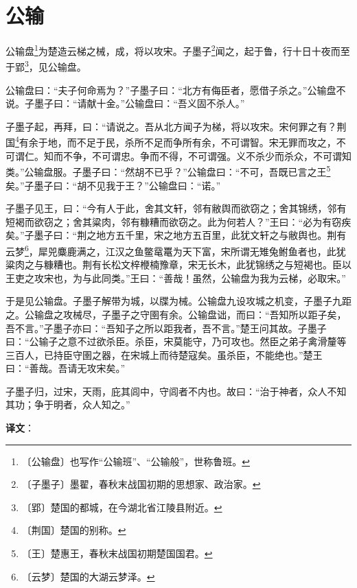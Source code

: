 \documentclass[12pt,UTF-8,openany]{ctexbook}
\begin{document}
\chapter{公输}

\begin{normalsize}
    
    公输盘\footnote{〔公输盘〕也写作“公输班”、“公输般”，世称鲁班。}为楚造云梯之械，成，将以攻宋。子墨子\footnote{〔子墨子〕墨翟，春秋末战国初期的思想家、政治家。}闻之，起于鲁，行十日十夜而至于郢\footnote{〔郢〕楚国的都城，在今湖北省江陵县附近。}，见公输盘。
    
    公输盘曰：“夫子何命焉为？”子墨子曰：“北方有侮臣者，愿借子杀之。”公输盘不说。子墨子曰：“请献十金。”公输盘曰：“吾义固不杀人。”
    
    子墨子起，再拜，曰：“请说之。吾从北方闻子为梯，将以攻宋。宋何罪之有？荆国\footnote{〔荆国〕楚国的别称。}有余于地，而不足于民，杀所不足而争所有余，不可谓智。宋无罪而攻之，不可谓仁。知而不争，不可谓忠。争而不得，不可谓强。义不杀少而杀众，不可谓知类。”公输盘服。子墨子曰：“然胡不已乎？”公输盘曰：“不可，吾既已言之王\footnote{〔王〕楚惠王，春秋末战国初期楚国国君。}矣。”子墨子曰：“胡不见我于王？”公输盘曰：“诺。”
    
    子墨子见王，曰：“今有人于此，舍其文轩，邻有敝舆而欲窃之；舍其锦绣，邻有短褐而欲窃之；舍其粱肉，邻有糠糟而欲窃之。此为何若人？”王曰：“必为有窃疾矣。”子墨子曰：“荆之地方五千里，宋之地方五百里，此犹文轩之与敝舆也。荆有云梦\footnote{〔云梦〕楚国的大湖云梦泽。}，犀兕麋鹿满之，江汉之鱼鳖鼋鼍为天下富，宋所谓无雉兔鲋鱼者也，此犹粱肉之与糠糟也。荆有长松文梓楩楠豫章，宋无长木，此犹锦绣之与短褐也。臣以王吏之攻宋也，为与此同类。”王曰：“善哉！虽然，公输盘为我为云梯，必取宋。”
    
    于是见公输盘。子墨子解带为城，以牒为械。公输盘九设攻城之机变，子墨子九距之。公输盘之攻械尽，子墨子之守圉有余。公输盘诎，而曰：“吾知所以距子矣，吾不言。”子墨子亦曰：“吾知子之所以距我者，吾不言。”楚王问其故。子墨子曰：“公输子之意不过欲杀臣。杀臣，宋莫能守，乃可攻也。然臣之弟子禽滑釐等三百人，已持臣守圉之器，在宋城上而待楚寇矣。虽杀臣，不能绝也。”楚王曰：“善哉。吾请无攻宋矣。”
    
    子墨子归，过宋，天雨，庇其闾中，守闾者不内也。故曰：“治于神者，众人不知其功；争于明者，众人知之。”
\end{normalsize}


\newpage

\textbf{译文}：

\vspace{1em}
\end{document}
